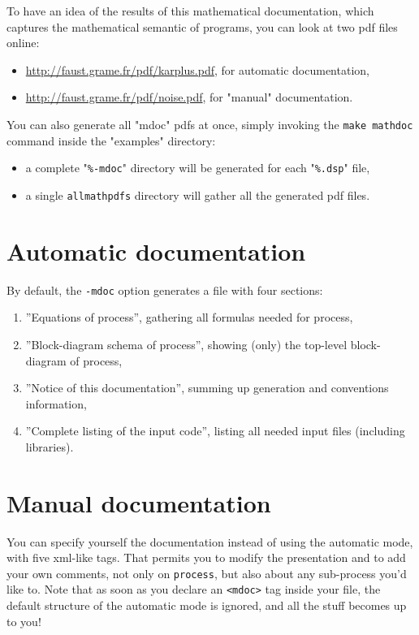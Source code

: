 \documentclass[a4paper]{book}
\begin{document}
To have an idea of the results of this mathematical documentation, which captures the mathematical semantic of \faust programs, you can look at two pdf files online:
\begin{itemize}
\item \url{http://faust.grame.fr/pdf/karplus.pdf}, for automatic documentation,
\item \url{http://faust.grame.fr/pdf/noise.pdf}, for "manual" documentation.
\end{itemize}

You can also generate all "mdoc" pdfs at once, simply invoking the \lstinline!make mathdoc! command inside the "examples" directory: 
\begin{itemize}
\item a complete "\lstinline!%-mdoc!" directory will be generated for each "\lstinline!%.dsp!" file,
\item a single \lstinline!allmathpdfs! directory will gather all the generated pdf files.
\end{itemize}


\section{Automatic documentation}
\label{sec:auto-docum}

By default, the \lstinline!-mdoc! option generates a \latex file with four sections:
\begin{enumerate}
\item ''Equations of process'', gathering all formulas needed for process,
\item ''Block-diagram schema of process'', showing (only) the top-level block-diagram of process,
\item ''Notice of this documentation'', summing up generation and conventions information,
\item ''Complete listing of the input code'', listing all needed input files (including libraries).
\end{enumerate}


\section{Manual documentation}
\label{sec:manual-mdoc}

You can specify yourself the documentation instead of using the automatic mode, with five xml-like tags. That permits you to modify the presentation and to add your own comments, not only on \lstinline!process!, but also about any sub-process you'd like to. Note that as soon as you declare an \lstinline!<mdoc>! tag inside your \faust file, the default structure of the automatic mode is ignored, and all the \latex stuff becomes up to you!
\end{document}
